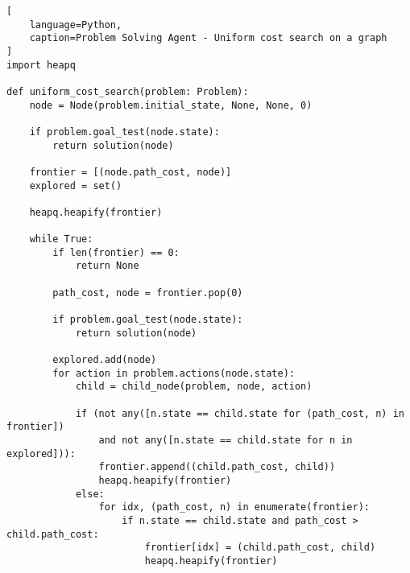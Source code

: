 \begin{lstlisting}[
    language=Python,
    caption=Problem Solving Agent - Uniform cost search on a graph
]
import heapq

def uniform_cost_search(problem: Problem):
    node = Node(problem.initial_state, None, None, 0)

    if problem.goal_test(node.state):
        return solution(node)

    frontier = [(node.path_cost, node)]
    explored = set()

    heapq.heapify(frontier)

    while True:
        if len(frontier) == 0:
            return None

        path_cost, node = frontier.pop(0)

        if problem.goal_test(node.state):
            return solution(node)

        explored.add(node)
        for action in problem.actions(node.state):
            child = child_node(problem, node, action)

            if (not any([n.state == child.state for (path_cost, n) in frontier])
                and not any([n.state == child.state for n in explored])):
                frontier.append((child.path_cost, child))
                heapq.heapify(frontier)
            else:
                for idx, (path_cost, n) in enumerate(frontier):
                    if n.state == child.state and path_cost > child.path_cost:
                        frontier[idx] = (child.path_cost, child)
                        heapq.heapify(frontier)
\end{lstlisting}





